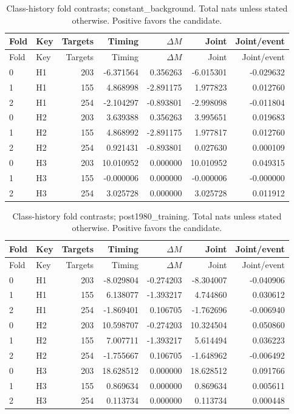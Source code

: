 {\small
\setlength{\tabcolsep}{3pt}
\begin{longtable}{llrrrrr}
\caption{Class-history fold contrasts; constant\_background. Total nats unless stated otherwise. Positive favors the candidate.}\label{tab:H-constant_background}\\
\toprule
Fold & Key & Targets & Timing & $\Delta M$ & Joint & Joint/event\\\midrule
\endfirsthead
\toprule
Fold & Key & Targets & Timing & $\Delta M$ & Joint & Joint/event\\\midrule
\endhead
0 & H1 & 203 & -6.371564 & 0.356263 & -6.015301 & -0.029632\\
1 & H1 & 155 & 4.868998 & -2.891175 & 1.977823 & 0.012760\\
2 & H1 & 254 & -2.104297 & -0.893801 & -2.998098 & -0.011804\\
0 & H2 & 203 & 3.639388 & 0.356263 & 3.995651 & 0.019683\\
1 & H2 & 155 & 4.868992 & -2.891175 & 1.977817 & 0.012760\\
2 & H2 & 254 & 0.921431 & -0.893801 & 0.027630 & 0.000109\\
0 & H3 & 203 & 10.010952 & 0.000000 & 10.010952 & 0.049315\\
1 & H3 & 155 & -0.000006 & 0.000000 & -0.000006 & -0.000000\\
2 & H3 & 254 & 3.025728 & 0.000000 & 3.025728 & 0.011912\\
\bottomrule
\end{longtable}
}

{\small
\setlength{\tabcolsep}{3pt}
\begin{longtable}{llrrrrr}
\caption{Class-history fold contrasts; post1980\_training. Total nats unless stated otherwise. Positive favors the candidate.}\label{tab:H-post1980_training}\\
\toprule
Fold & Key & Targets & Timing & $\Delta M$ & Joint & Joint/event\\\midrule
\endfirsthead
\toprule
Fold & Key & Targets & Timing & $\Delta M$ & Joint & Joint/event\\\midrule
\endhead
0 & H1 & 203 & -8.029804 & -0.274203 & -8.304007 & -0.040906\\
1 & H1 & 155 & 6.138077 & -1.393217 & 4.744860 & 0.030612\\
2 & H1 & 254 & -1.869401 & 0.106705 & -1.762696 & -0.006940\\
0 & H2 & 203 & 10.598707 & -0.274203 & 10.324504 & 0.050860\\
1 & H2 & 155 & 7.007711 & -1.393217 & 5.614494 & 0.036223\\
2 & H2 & 254 & -1.755667 & 0.106705 & -1.648962 & -0.006492\\
0 & H3 & 203 & 18.628512 & 0.000000 & 18.628512 & 0.091766\\
1 & H3 & 155 & 0.869634 & 0.000000 & 0.869634 & 0.005611\\
2 & H3 & 254 & 0.113734 & 0.000000 & 0.113734 & 0.000448\\
\bottomrule
\end{longtable}
}

